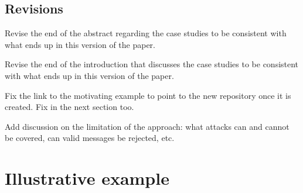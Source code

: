 \documentclass[global,twocolumn]{svjour}
\newif\ifREVISIONS
\begin{document}
\subsection{Revisions}
\begin{compactitem}
  \item Revise the end of the abstract regarding the case studies to be consistent with what ends up in this version of the paper.
  \item Revise the end of the introduction that discusses the case studies to be consistent with what ends up in this version of the paper.
  \item Fix the link to the motivating example to point to the new repository once it is created. Fix in the next section too.
  \item Add discussion on the limitation of the approach: what attacks can and cannot be covered, can valid messages be rejected, etc.
\end{compactitem}
\fi

\section{Illustrative example}
\label{sec:example}


\ifREVISIONS
\subsection{Revisions}
\begin{compactitem}
  \item \sout{Reformat text to put single sentence on each line.}
  \item Move example to its own repository, archive, and give the DOI and URL for the example.
  \item \sout{Update AGREE certificates with new model}
  \item Separate example into separate files for initial design, cyber-components and tests, hardened design, and seL4 process design.
  \item \sout{Make clear the initial properties for the assumed correct model:}
    \begin{compactitem}
      \item \sout{Assume at the system level that a new automation request is not sent unless the prior request, if any, is acknowledged}
      \item \sout{Assume at all levels input messages are well-formed}
      \item \sout{Guarantee at all levels that waypoint outputs coincide with air vehicle location messages}
      \item \sout{Guarantee that a start from the waypoint manager coincides with an automation response}
      \item \sout{Guarantee for all trusted components that outputs are well-formed}
    \end{compactitem}
  \item Add citations, and remove KLS footnote to last paragraph---should cite HAMR, seL4, and Adventium.
\end{compactitem}
\fi
\end{document}
